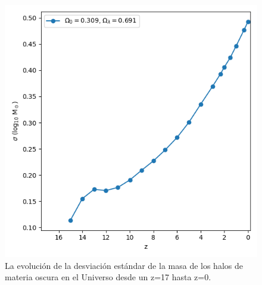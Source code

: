 \documentclass{beamer}
\begin{document}
\begin{frame}
\begin{columns}[t]
			\begin{column}{.5\textwidth}
				\begin{figure}
					\centering
					\includegraphics[scale=0.3]{RunCanonica/MassStd_RunCanonica.png}
					\caption{\footnotesize La evolución de la desviación estándar de la masa de los halos de materia oscura en el Universo desde un z=17 hasta z=0.}
					\label{fig:Canon-MassStd}
				\end{figure}
			\end{column}
		\end{columns}

	\end{frame}	
\end{document}
